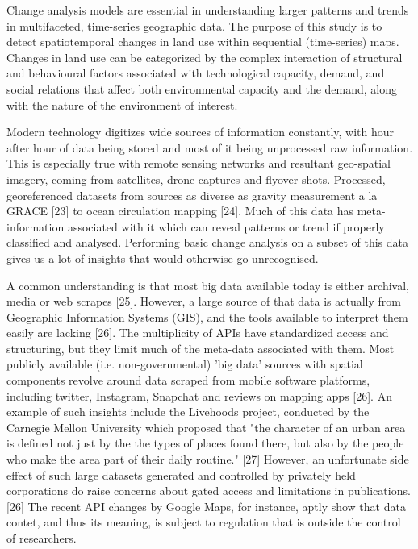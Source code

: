 \documentclass[conference]{IEEEtran}
\begin{document}
Change analysis models are essential in understanding larger patterns and trends in multifaceted, time-series geographic data. The purpose of this study is to detect spatiotemporal changes in land use within sequential (time-series) maps. Changes in land use can be categorized by the complex interaction of structural and behavioural factors associated with technological capacity, demand, and social relations that affect both environmental capacity and the demand, along with the nature of the environment of interest.

Modern technology digitizes wide sources of information constantly, with hour after hour of data being stored and most of it being unprocessed raw information. This is especially true with remote sensing networks and resultant geo-spatial imagery, coming from satellites, drone captures and flyover shots. Processed, georeferenced datasets from sources as diverse as gravity measurement a la GRACE [23] to ocean circulation mapping [24]. Much of this data has meta-information associated with it which can reveal patterns or trend if properly classified and analysed. Performing basic change analysis on a subset of this data gives us a lot of insights that would otherwise go unrecognised.

A common understanding is that most big data available today is either archival, media or web scrapes [25]. However, a large source of that data is actually from Geographic Information Systems (GIS), and the tools available to interpret them easily are lacking [26]. The multiplicity of APIs have standardized access and structuring, but they limit much of the meta-data associated with them. Most publicly available (i.e. non-governmental) 'big data' sources with spatial components revolve around data scraped from mobile software platforms, including twitter, Instagram, Snapchat and reviews on mapping apps [26]. An example of such insights include the Livehoods project, conducted by the Carnegie Mellon University which proposed that "the character of an urban area is defined not just by the the types of places found there, but also by the people who make the area part of their daily routine." [27] However, an unfortunate side effect of such large datasets generated and controlled by privately held corporations do raise concerns about gated access and limitations in publications. [26] The recent API changes by Google Maps, for instance, aptly show that data contet, and thus its meaning, is subject to regulation that is outside the control of researchers.
 
\end{document}
